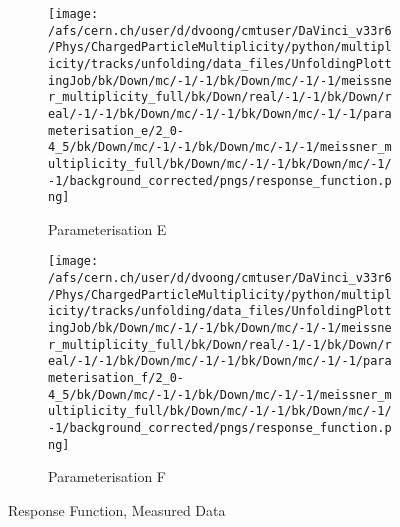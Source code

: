 \begin{figure}[h]
\begin{subfigure}{0.49\textwidth}
	\end{subfigure}
	\begin{subfigure}{0.49\textwidth}
		\texttt{[image: /afs/cern.ch/user/d/dvoong/cmtuser/DaVinci\_v33r6/Phys/ChargedParticleMultiplicity/python/multiplicity/tracks/unfolding/data\_files/UnfoldingPlottingJob/bk/Down/mc/-1/-1/bk/Down/mc/-1/-1/meissner\_multiplicity\_full/bk/Down/real/-1/-1/bk/Down/real/-1/-1/bk/Down/mc/-1/-1/bk/Down/mc/-1/-1/parameterisation\_e/2\_0-4\_5/bk/Down/mc/-1/-1/bk/Down/mc/-1/-1/meissner\_multiplicity\_full/bk/Down/mc/-1/-1/bk/Down/mc/-1/-1/background\_corrected/pngs/response\_function.png]}
		\caption{Parameterisation E}
	\end{subfigure}
	\begin{subfigure}{0.49\textwidth}
		\texttt{[image: /afs/cern.ch/user/d/dvoong/cmtuser/DaVinci\_v33r6/Phys/ChargedParticleMultiplicity/python/multiplicity/tracks/unfolding/data\_files/UnfoldingPlottingJob/bk/Down/mc/-1/-1/bk/Down/mc/-1/-1/meissner\_multiplicity\_full/bk/Down/real/-1/-1/bk/Down/real/-1/-1/bk/Down/mc/-1/-1/bk/Down/mc/-1/-1/parameterisation\_f/2\_0-4\_5/bk/Down/mc/-1/-1/bk/Down/mc/-1/-1/meissner\_multiplicity\_full/bk/Down/mc/-1/-1/bk/Down/mc/-1/-1/background\_corrected/pngs/response\_function.png]}
		\caption{Parameterisation F}
	\end{subfigure}
	\caption{Response Function, Measured Data}
	\label{fig: response function, measured data}
\end{figure}

